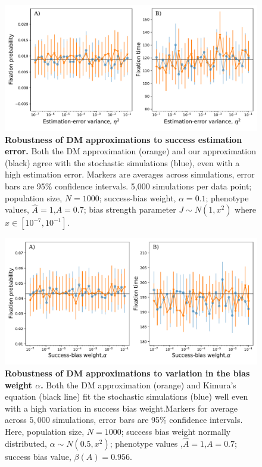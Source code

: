 \documentclass[12pt]{extarticle}
\begin{document}
\begin{figure}
    \includegraphics[width=\linewidth]{../figures/final/full_vs_dm_mutation.pdf}
  \caption{
  \textbf{Robustness of DM approximations to success estimation error.}
  Both the DM approximation (orange) and our approximation (black) agree with the stochastic simulations (blue), even with a high estimation error.
  Markers are averages across simulations, error bars are 95\% confidence intervals.
  5,000 simulations per data point; population size, $N=1000$; success-bias weight, $\alpha=0.1$; phenotype values, $\hat{A}=1$,$A=0.7$; bias strength parameter $J\sim N(1,x^2)$ where $x \in [10^{-7},10^{-1}]$. %
  }	
  \label{fig:hetro_error}
\end{figure}


\begin{figure}
    \includegraphics[width=\linewidth]{../figures/final/full_vs_dm_changing_alpha.pdf}
   \caption{\textbf{Robustness of DM approximations to variation in the bias weight $\alpha$.} 
   Both the DM approximation (orange) and Kimura's equation (black line) fit the stochastic simulations (blue) well even with a high variation in success bias weight.Markers for average across $5,000$ simulations, error bars are 95\% confidence intervals.
  Here, population size, $N=1000$; success bias weight normally distributed, $\alpha\sim N(0.5,x^2)$; phenotype values ,$\hat{A}=1$,$A=0.7$; success bias value, $\beta(A)=0.956$.}	
  \label{fig:hetro_alpha}
\end{figure}
\end{document}
